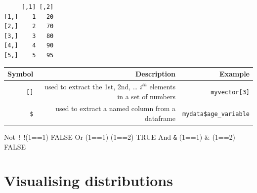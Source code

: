 \documentclass[]{book}
\begin{document}
\begin{verbatim}
     [,1] [,2]
[1,]    1   20
[2,]    2   70
[3,]    3   80
[4,]    4   90
[5,]    5   95
\end{verbatim}

\begin{longtable}[]{@{}rrr@{}}
\toprule
\begin{minipage}[b]{0.30\columnwidth}\raggedleft
Symbol\strut
\end{minipage} & \begin{minipage}[b]{0.30\columnwidth}\raggedleft
Description\strut
\end{minipage} & \begin{minipage}[b]{0.30\columnwidth}\raggedleft
Example\strut
\end{minipage}\tabularnewline
\midrule
\endhead
\begin{minipage}[t]{0.30\columnwidth}\raggedleft
\texttt{{[}{]}}\strut
\end{minipage} & \begin{minipage}[t]{0.30\columnwidth}\raggedleft
used to extract the 1st, 2nd, \ldots{} \(i^{th}\) elements in a set of numbers\strut
\end{minipage} & \begin{minipage}[t]{0.30\columnwidth}\raggedleft
\texttt{myvector{[}3{]}}\strut
\end{minipage}\tabularnewline
\begin{minipage}[t]{0.30\columnwidth}\raggedleft
\texttt{\$}\strut
\end{minipage} & \begin{minipage}[t]{0.30\columnwidth}\raggedleft
used to extract a named column from a dataframe\strut
\end{minipage} & \begin{minipage}[t]{0.30\columnwidth}\raggedleft
\texttt{mydata\$age\_variable}\strut
\end{minipage}\tabularnewline
\bottomrule
\end{longtable}

Not \textbar{} \texttt{!} \textbar{} !(1==1) \textbar{} FALSE
Or \textbar{} \texttt{\textbar{}} \textbar{} (1==1) \textbar{} (1==2) \textbar{} TRUE
And \textbar{} \texttt{\&} \textbar{} (1==1) \& (1==2) \textbar{} FALSE

\hypertarget{chap-visualising-distributions}{%
\chapter{Visualising distributions}\label{chap-visualising-distributions}}
\end{document}
